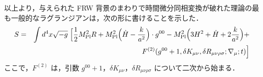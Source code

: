 以上より，与えられた FRW 背景のまわりで時間微分同相変換が破れた理論の最も一般的なラグランジアンは，次の形に書けることを示した．
\begin{eqnarray}\label{eq:general2}
S &=& \int d^4x \sqrt{-g} \; \Big[\frac12 M_{\rm Pl}^2 R + M_{\rm Pl}^2 \Big(\dot H-\frac{k}{a^2}\Big) \cdot g^{00} - M_{\rm Pl}^2 \Big(3 H^2 +\dot H+2\frac{k}{a^2}\Big) +  \\ \nonumber &&  F^{(2)}(g^{00}+1,\delta K_{\mu\nu}, \delta R_{\mu\nu\rho\sigma};\nabla_\mu;t)\Big]
\end{eqnarray}
ここで，$F^{(2)}$ は，引数 $g^{00}+1$，$\delta K_{\mu\nu}$，$\delta R_{\mu\nu\rho\sigma}$ について二次から始まる．

